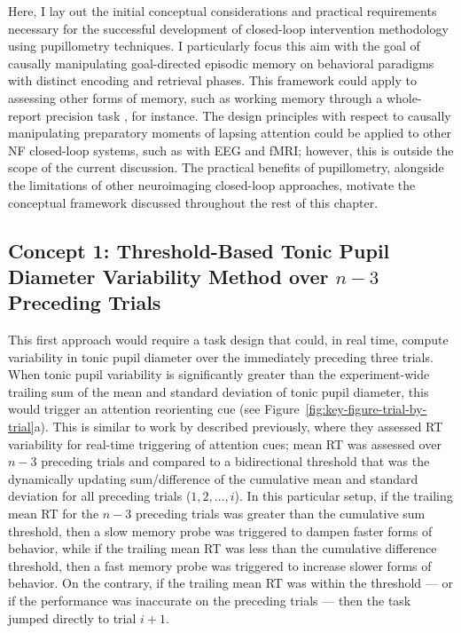 Here, I lay out the initial conceptual considerations and practical requirements necessary for the successful development of closed-loop intervention methodology using pupillometry techniques. I particularly focus this aim with the goal of causally manipulating goal-directed episodic memory on behavioral paradigms with distinct encoding and retrieval phases. This framework could apply to assessing other forms of memory, such as working memory through a whole-report precision task \parencite{adam2017clear}, for instance. The design principles with respect to causally manipulating preparatory moments of lapsing attention could be applied to other NF closed-loop systems, such as with EEG and fMRI; however, this is outside the scope of the current discussion. The practical benefits of pupillometry, alongside the limitations of other neuroimaging closed-loop approaches, motivate the conceptual framework discussed throughout the rest of this chapter.

\subsection{Concept 1: Threshold-Based Tonic Pupil Diameter Variability Method over $n - 3$ Preceding Trials}\label{section:concept-1}

This first approach would require a task design that could, in real time, compute variability in tonic pupil diameter over the immediately preceding three trials. When tonic pupil variability is significantly greater than the experiment-wide trailing sum of the mean and standard deviation of tonic pupil diameter, this would trigger an attention reorienting cue (see Figure~\ref{fig:key-figure-trial-by-trial}a). This is similar to work by \textcite{debettencourt2019realtime} described previously, where they assessed RT variability for real-time triggering of attention cues; mean RT was assessed over $n - 3$ preceding trials and compared to a bidirectional threshold that was the dynamically updating sum/difference of the cumulative mean and standard deviation for all preceding trials ($1, 2, \ldots, i$). In this particular setup, if the trailing mean RT for the $n - 3$ preceding trials was greater than the cumulative sum threshold, then a slow memory probe was triggered to dampen faster forms of behavior, while if the trailing mean RT was less than the cumulative difference threshold, then a fast memory probe was triggered to increase slower forms of behavior. On the contrary, if the trailing mean RT was within the threshold --- or if the performance was inaccurate on the preceding trials --- then the task jumped directly to trial $i + 1$.

